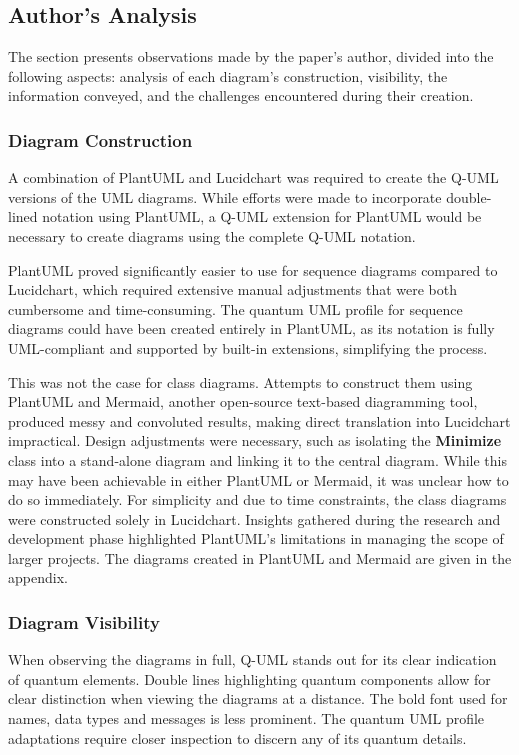 \documentclass{article}
\begin{document}
\subsection{Author's Analysis}

The section presents observations made by the paper's author, divided into the following aspects: analysis of each diagram's construction, visibility, the information conveyed, and the challenges encountered during their creation.

\subsubsection{Diagram Construction}

A combination of PlantUML and Lucidchart was required to create the Q-UML versions of the UML diagrams. While efforts were made to incorporate double-lined notation using PlantUML, a Q-UML extension for PlantUML would be necessary to create diagrams using the complete Q-UML notation.

PlantUML proved significantly easier to use for sequence diagrams compared to Lucidchart, which required extensive manual adjustments that were both cumbersome and time-consuming. The quantum UML profile for sequence diagrams could have been created entirely in PlantUML, as its notation is fully UML-compliant and supported by built-in extensions, simplifying the process.

This was not the case for class diagrams. Attempts to construct them using PlantUML and Mermaid, another open-source text-based diagramming tool, produced messy and convoluted results, making direct translation into Lucidchart impractical. Design adjustments were necessary, such as isolating the \textbf{Minimize} class into a stand-alone diagram and linking it to the central diagram. While this may have been achievable in either PlantUML or Mermaid, it was unclear how to do so immediately. For simplicity and due to time constraints, the class diagrams were constructed solely in Lucidchart. Insights gathered during the research and development phase highlighted PlantUML's limitations in managing the scope of larger projects\cite{plantreddit}. The diagrams created in PlantUML and Mermaid are given in the appendix. 

\subsubsection{Diagram Visibility}

When observing the diagrams in full, Q-UML stands out for its clear indication of quantum elements. Double lines highlighting quantum components allow for clear distinction when viewing the diagrams at a distance. The bold font used for names, data types and messages is less prominent. The quantum UML profile adaptations require closer inspection to discern any of its quantum details.
\end{document}
